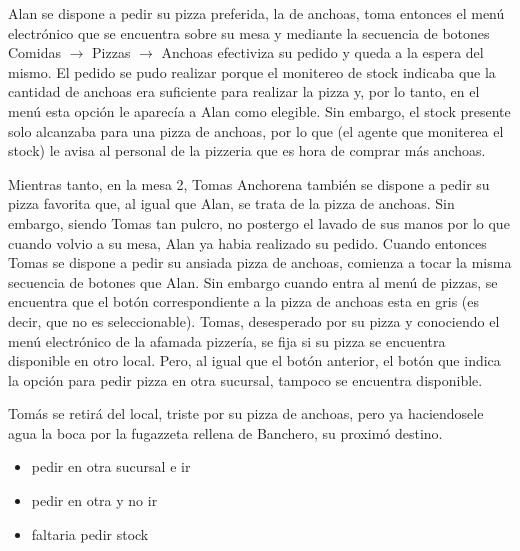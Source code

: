 \documentclass[a4paper,10pt]{article}
\begin{document}
Alan se dispone a pedir su pizza preferida, la de anchoas, toma entonces el men\'u electr\'onico que se encuentra sobre su mesa y
mediante la secuencia de botones Comidas $\rightarrow$ Pizzas $\rightarrow$ Anchoas efectiviza su pedido y queda a la espera del mismo. El pedido se pudo 
realizar porque el monitereo de stock indicaba que la cantidad de anchoas era suficiente para realizar la pizza y, por lo tanto, en el men\'u
esta opci\'on le aparec\'ia a Alan como elegible. Sin embargo, el stock presente solo alcanzaba para una pizza de anchoas, por lo que (el agente
que moniterea el stock) le avisa al personal de la pizzeria que es hora de comprar m\'as anchoas.

Mientras tanto, en la mesa 2, Tomas Anchorena tambi\'en se dispone a pedir su pizza favorita que, al igual que Alan, se trata de la pizza de 
anchoas. Sin embargo, siendo Tomas tan pulcro, no postergo el lavado de sus manos por lo que cuando volvio a su mesa, Alan ya habia realizado
su pedido. Cuando entonces Tomas se dispone a pedir su ansiada pizza de anchoas, comienza a tocar la misma secuencia de botones que Alan. Sin embargo
cuando entra al men\'u de pizzas, se encuentra que el bot\'on correspondiente a la pizza de anchoas esta en gris (es decir, que no es seleccionable).
Tomas, desesperado por su pizza y conociendo el men\'u electr\'onico de la afamada pizzer\'ia, se fija si su pizza se encuentra disponible en otro
local. Pero, al igual que el bot\'on anterior, el bot\'on que indica la opci\'on para pedir pizza en otra sucursal, tampoco se encuentra disponible.

Tom\'as se retir\'a del local, triste por su pizza de anchoas, pero ya haciendosele agua la boca por la fugazzeta rellena de Banchero, su proxim\'o destino.

 
\begin{itemize}
\item pedir en otra sucursal e ir
\item pedir en otra y no ir
\item faltaria pedir stock
\end{itemize}

\end{document}
